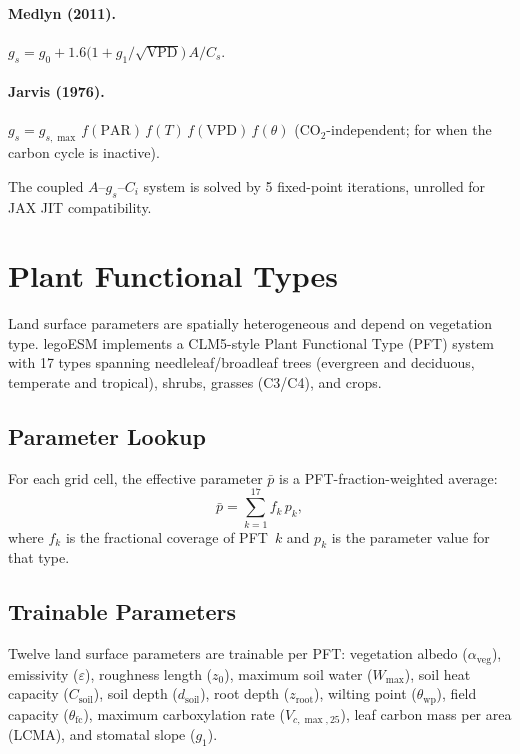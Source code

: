 \documentclass[11pt,twoside]{report}
\begin{document}
\paragraph{Medlyn (2011).}
$g_s = g_0 + 1.6\bigl(1+g_1/\!\sqrt{\mathrm{VPD}}\bigr)\,A/C_s$.

\paragraph{Jarvis (1976).}
$g_s = g_{s,\max}\,f(\mathrm{PAR})\,f(T)\,f(\mathrm{VPD})\,f(\theta)$
(CO$_2$-independent; for when the carbon cycle is inactive).

The coupled $A$--$g_s$--$C_i$ system is solved by 5 fixed-point
iterations, unrolled for JAX JIT compatibility.


\section{Plant Functional Types}
\label{sec:pft}

Land surface parameters are spatially heterogeneous and depend on vegetation type.  legoESM implements a CLM5-style Plant Functional Type (PFT) system with 17 types spanning needleleaf/broadleaf trees (evergreen and deciduous, temperate and tropical), shrubs, grasses (C3/C4), and crops.

\subsection{Parameter Lookup}

For each grid cell, the effective parameter $\bar{p}$ is a PFT-fraction-weighted average:
\begin{equation}
  \bar{p} = \sum_{k=1}^{17} f_k\,p_k,
\end{equation}
where $f_k$ is the fractional coverage of PFT~$k$ and $p_k$ is the parameter value for that type.

\subsection{Trainable Parameters}

Twelve land surface parameters are trainable per PFT: vegetation albedo ($\alpha_{\mathrm{veg}}$), emissivity ($\varepsilon$), roughness length ($z_0$), maximum soil water ($W_{\max}$), soil heat capacity ($C_{\mathrm{soil}}$), soil depth ($d_{\mathrm{soil}}$), root depth ($z_{\mathrm{root}}$), wilting point ($\theta_{\mathrm{wp}}$), field capacity ($\theta_{\mathrm{fc}}$), maximum carboxylation rate ($V_{c,\max,25}$), leaf carbon mass per area (LCMA), and stomatal slope ($g_1$).
\end{document}

